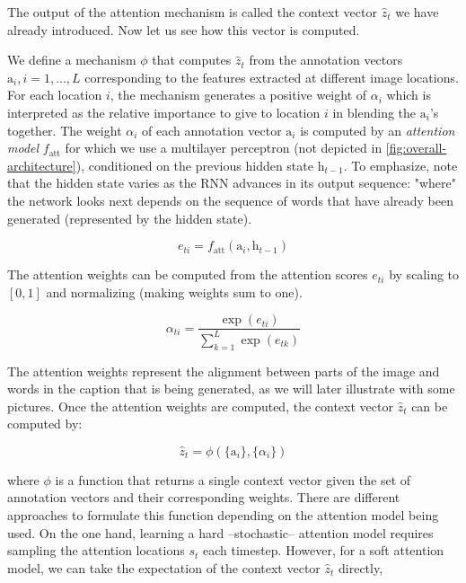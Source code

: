 The output of the attention mechanism is called the context vector $\hat{z}_t$ we have already introduced. Now let us see how this vector is computed.

We define a mechanism $\phi$ that computes $\hat{z}_t$ from the annotation vectors $\text{a}_i, i =1,...,L$ corresponding to the features extracted at different image locations. For each location $i$, the mechanism generates a positive weight of $\alpha_i$ which is interpreted as the relative importance to give to location $i$ in blending the $\text{a}_i$'s together. The weight $\alpha_i$ of each annotation vector $\text{a}_i$ is computed by an \textit{attention model} $f_\text{att}$ for which we use a multilayer perceptron (not depicted in \cref{fig:overall-architecture}), conditioned on the previous hidden state $\text{h}_{t-1}$. To emphasize, note that the hidden state varies as the RNN advances in its output sequence: "where" the network looks next depends on the sequence of words that have already been generated (represented by the hidden state).

\begin{equation}\label{eq:att-scores}
 e_{ti} = f_\text{att}(\text{a}_i, \text{h}_{t-1})  
\end{equation}

The attention weights can be computed from the attention scores $e_{ti}$ by scaling to $[0,1]$ and normalizing (making weights sum to one).

\begin{equation}\label{eq:att-weights}
\alpha_{ti} = \frac{\exp{(e_{ti})}}{\sum_{k=1}^L \exp{(e_{tk})}}
\end{equation}

The attention weights represent the alignment between parts of the image and words in the caption that is being generated, as we will later illustrate with some pictures. Once the attention weights are computed, the context vector $\hat{z}_t$ can be computed by:

\begin{equation}\label{eq:att-context-1}
\hat{z}_t = \phi (\{\text{a}_i\},\{\alpha_i\})
\end{equation}

where $\phi$ is a function that returns a single context vector given the set of annotation vectors and their corresponding weights. There are different approaches to formulate this function depending on the attention model being used. On the one hand, learning a hard --stochastic-- attention model requires sampling the attention locations $s_t$ each timestep. However, for a soft attention model, we can take the expectation of the context vector $\hat{z}_t$ directly,

